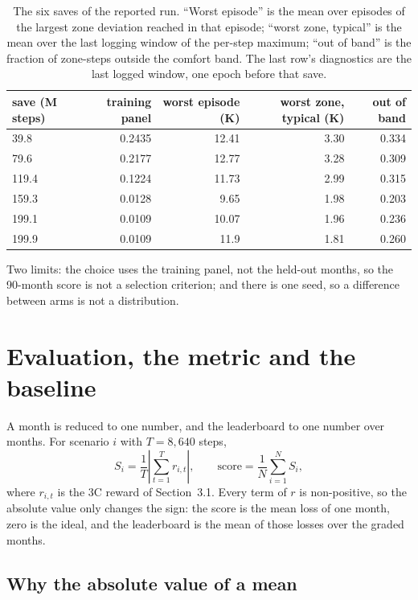 \documentclass{article}
\begin{document}
\begin{table}[h!]
\centering
\small
\begin{tabular}{@{}lrrrr@{}}
\toprule
save (M steps) & training panel & worst episode (K) & worst zone, typical (K) & out of band \\
\midrule
39.8 & 0.2435 & 12.41 & 3.30 & 0.334 \\
79.6 & 0.2177 & 12.77 & 3.28 & 0.309 \\
119.4 & 0.1224 & 11.73 & 2.99 & 0.315 \\
159.3 & 0.0128 & 9.65 & 1.98 & 0.203 \\
199.1 & 0.0109 & 10.07 & 1.96 & 0.236 \\
199.9 & 0.0109 & 11.9 & 1.81 & 0.260 \\
\bottomrule
\end{tabular}
\vspace{4pt}
\caption{The six saves of the reported run. ``Worst episode'' is the mean over episodes of the largest zone deviation reached in that episode; ``worst zone, typical'' is the mean over the last logging window of the per-step maximum; ``out of band'' is the fraction of zone-steps outside the comfort band. The last row's diagnostics are the last logged window, one epoch before that save.}
\label{tab:app_saves}
\end{table}

Two limits: the choice uses the training panel, not the held-out months, so the 90-month score is not a selection criterion; and there is one seed, so a difference between arms is not a distribution.

\section{Evaluation, the metric and the baseline}
\label{app:eval}

A month is reduced to one number, and the leaderboard to one number over months. For scenario $i$ with $T=8{,}640$ steps,
\[
S_i=\frac{1}{T}\left|\sum_{t=1}^{T}r_{i,t}\right|,\qquad \text{score}=\frac{1}{N}\sum_{i=1}^{N}S_i,
\]
where $r_{i,t}$ is the 3C reward of Section~3.1. Every term of $r$ is non-positive, so the absolute value only changes the sign: the score is the mean loss of one month, zero is the ideal, and the leaderboard is the mean of those losses over the graded months.

\subsection{Why the absolute value of a mean}
\label{app:abs}
\end{document}
